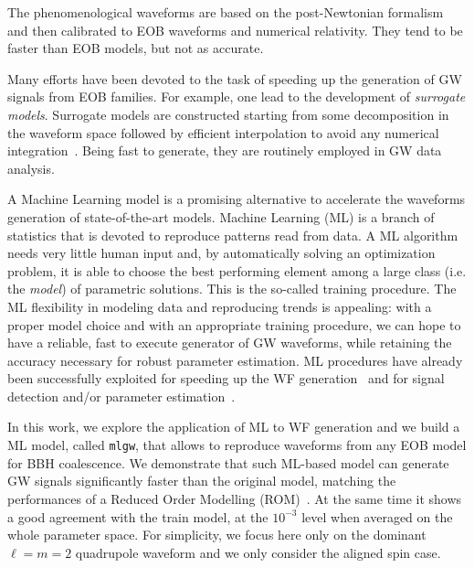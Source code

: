 The phenomenological waveforms are based on the post-Newtonian formalism and then calibrated 
to  EOB waveforms and numerical relativity. They tend to be faster than EOB models, but not as accurate.

Many efforts have been devoted to the task of speeding up the generation of GW signals from 
EOB families. For example, one lead to the development of \textit{surrogate models}. Surrogate 
models are constructed starting from some decomposition in the waveform space followed by efficient 
interpolation to avoid any  numerical integration~\cite{Purrer:2015tud,Bohe:2016gbl,Purrer:2017str,Lackey:2018zvw,Cotesta:2020qhw}. 
Being fast to generate, they are routinely employed in GW data analysis. 

A Machine Learning model is a promising alternative to accelerate the
waveforms generation of state-of-the-art models.
Machine Learning (ML) is a branch of statistics that is devoted to reproduce patterns read from data. 
A ML algorithm needs very little human input and, by automatically solving an optimization problem, 
it is able to choose the best performing element among a large class (i.e. the \textit{model}) of parametric solutions. 
This is the so-called training procedure. 
The ML flexibility in modeling data and reproducing trends is appealing: with a proper model choice 
and with an appropriate training procedure, we can hope to have a reliable, fast to execute generator 
of GW waveforms, while retaining the accuracy necessary for robust parameter estimation.
ML procedures have already been successfully exploited for speeding up the WF generation~\cite{Khan:2020fso, Chua_2019}
and for signal detection and/or parameter estimation~\cite{Gabbard:2017lja,George:2017pmj,George:2017vlv,Rebei:2018lzh,Chatterjee:2019gqr,Wong:2020wvd, Khan:2020foe}.

In this work, we explore the application of ML to WF generation and we build a ML model, called \texttt{mlgw}, that allows to reproduce 
waveforms from any EOB model for BBH coalescence. We demonstrate that such ML-based model can generate 
GW signals significantly faster than the original model, 
matching the performances of a Reduced Order Modelling 
(ROM)~\cite{Purrer:2015tud,Bohe:2016gbl,Purrer:2017str}.  
At the same time it shows a good agreement with the train model, at the $10^{-3}$ level when 
averaged on the whole parameter space. For simplicity, we focus here only on the 
dominant $\ell=m=2$ quadrupole waveform and we only consider the aligned spin case.

